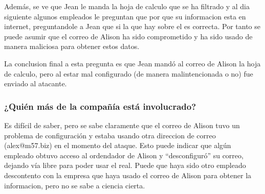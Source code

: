 \documentclass{article}
\begin{document}


Además, se ve que Jean le manda la hoja de calculo que se ha filtrado y al dia siguiente algunos empleados le preguntan que por que su informacion esta en internet, preguntandole a Jean que si la que hay sobre el es correcta. Por tanto se puede asumir que el correo de Alison ha sido comprometido y ha sido usado de manera maliciosa para obtener estos datos.

La conclusion final a esta pregunta es que Jean mandó al correo de Alison la hoja de calculo, pero al estar mal configurado (de manera malintencionada o no) fue enviado al atacante.


\subsubsection*{¿Quién más de la compañía está involucrado?}

Es difícil de saber, pero se sabe claramente que el correo de Alison tuvo un problema de configuración y estaba usando otra direccion de correo (alex@m57.biz) en el momento del ataque. Esto puede indicar que algún empleado obtuvo acceso al ordendador de Alison y ``desconfiguró'' su correo, dejando vía libre para poder usar el real. Puede que haya sido otro empleado descontento con la empresa que haya usado el correo de Alison para obtener la informacion, pero no se sabe a ciencia cierta.
\end{document}
